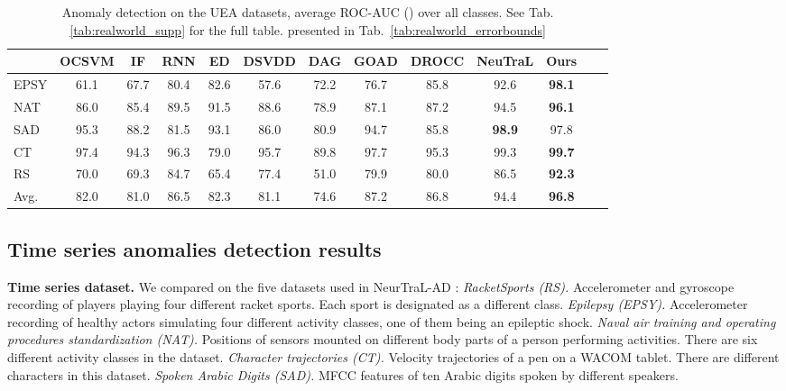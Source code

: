 \documentclass{article}
\begin{document}
\begin{table*}
\caption{Anomaly detection on the UEA datasets, average ROC-AUC () over all classes. \newline See Tab.\ref{tab:realworld_supp} for the full table.  presented in Tab.~\ref{tab:realworld_errorbounds}}
\centering
\small
\begin{tabular}{lcccccccccccc}
\toprule

	&	OCSVM	&	IF	&		RNN	&	ED	&	DSVDD	& DAG		&	GOAD	&	DROCC	&	NeuTraL	&	Ours	\\ \midrule
EPSY	&	61.1	&	67.7		&	80.4	&	82.6	&	57.6	& 72.2  &	76.7	&	85.8	&	92.6	&	\textbf{98.1}	\\
NAT	&	86.0	&	85.4		&	89.5	&	91.5	&	88.6 & 78.9	& 	87.1	&	87.2	&	94.5	&	\textbf{96.1}	\\
SAD	&	95.3	&	88.2	&	81.5	&	93.1	&	86.0 & 80.9	& 	94.7	&	85.8	&	\textbf{98.9}	&	97.8	\\
CT	&	97.4	&	94.3		&	96.3	&	79.0	&	95.7 & 89.8	& 	97.7	&	95.3	&	99.3	&	\textbf{99.7}	\\
RS	&	70.0	&	69.3		&	84.7	&	65.4	&	77.4 & 51.0	& 	79.9	&	80.0	&	86.5	& \textbf{92.3}		\\ \midrule
Avg.	&	82.0	&	81.0	&	86.5	&	82.3	&	81.1 & 74.6 	&	87.2	&	86.8	&	94.4	&	\textbf{96.8}	\\

\bottomrule
\end{tabular}
\label{tab:realworld}
\end{table*}

\subsection{Time series anomalies detection results}

\label{subsec:time_series}

\textbf{Time series dataset.} We compared on the five datasets used in NeurTraL-AD \cite{qiu2021neural}: \textit{RacketSports (RS).} Accelerometer and gyroscope recording of players playing four different racket sports. Each sport is designated as a different class. \textit{Epilepsy (EPSY).} Accelerometer recording of healthy actors simulating four different activity classes, one of them being an epileptic shock. \textit{Naval air training and operating procedures standardization (NAT).} Positions of sensors mounted on different body parts of a person performing activities. There are six different activity classes in the dataset. \textit{Character trajectories (CT).} Velocity trajectories of a pen on a WACOM tablet. There are  different characters in this dataset.  \textit{Spoken Arabic Digits (SAD).} MFCC features of ten Arabic digits spoken by  different speakers.
\end{document}

